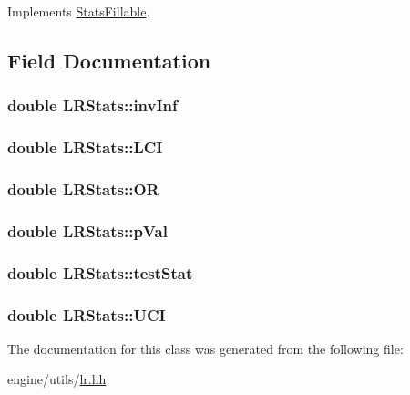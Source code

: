 Implements \hyperlink{classStatsFillable_a6bc1a66ea949a078faa1b9ccdac54aba}{StatsFillable}.



\subsection{Field Documentation}
\hypertarget{classLRStats_ad381b8b63712614b6d5cbdc46fdaf74f}{
\subsubsection[{invInf}]{\setlength{\rightskip}{0pt plus 5cm}double {\bf LRStats::invInf}}}
\label{classLRStats_ad381b8b63712614b6d5cbdc46fdaf74f}
\hypertarget{classLRStats_a7a5645105fa178c1ae07ea41ce7265a7}{
\subsubsection[{LCI}]{\setlength{\rightskip}{0pt plus 5cm}double {\bf LRStats::LCI}}}
\label{classLRStats_a7a5645105fa178c1ae07ea41ce7265a7}
\hypertarget{classLRStats_ad2dc69ad8ef363196f7e1eb518d2749f}{
\subsubsection[{OR}]{\setlength{\rightskip}{0pt plus 5cm}double {\bf LRStats::OR}}}
\label{classLRStats_ad2dc69ad8ef363196f7e1eb518d2749f}
\hypertarget{classLRStats_ab9c060dd747842d661d3ac3d3e7e7d8a}{
\subsubsection[{pVal}]{\setlength{\rightskip}{0pt plus 5cm}double {\bf LRStats::pVal}}}
\label{classLRStats_ab9c060dd747842d661d3ac3d3e7e7d8a}
\hypertarget{classLRStats_a56946d63e769f7028683ce7899edd568}{
\subsubsection[{testStat}]{\setlength{\rightskip}{0pt plus 5cm}double {\bf LRStats::testStat}}}
\label{classLRStats_a56946d63e769f7028683ce7899edd568}
\hypertarget{classLRStats_a732a4d2d532d710c0eebbd55a5ea1cd4}{
\subsubsection[{UCI}]{\setlength{\rightskip}{0pt plus 5cm}double {\bf LRStats::UCI}}}
\label{classLRStats_a732a4d2d532d710c0eebbd55a5ea1cd4}


The documentation for this class was generated from the following file:\begin{DoxyCompactItemize}
\item 
engine/utils/\hyperlink{lr_8hh}{lr.hh}\end{DoxyCompactItemize}
